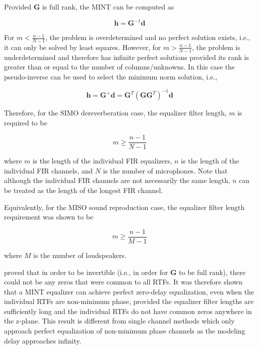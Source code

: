 \noindent
Provided $\boldsymbol{G}$ is full rank, the MINT can be computed as

\begin{equation}
	\boldsymbol{h} = \boldsymbol{G}^{-1}\boldsymbol{d}
\end{equation}

For $m < \frac{n-1}{N-1}$, the problem is overdetermined and no perfect solution exists, i.e., it can only be solved by least squares. However, for $m > \frac{n-1}{N-1}$, the problem is underdetermined and therefore has infinite perfect solutions provided its rank is greater than or equal to the number of columns/unknowns. In this case the pseudo-inverse can be used to select the minimum norm solution, i.e.,

\begin{equation}
	\boldsymbol{h} = \boldsymbol{G}^+\boldsymbol{d} = \boldsymbol{G}^T(\boldsymbol{G}\boldsymbol{G}^T)^{-1}\boldsymbol{d}
\end{equation}


 Therefore, for the SIMO dereverberation case, the equalizer filter length, $m$ is required to be

\begin{equation}
	m \ge \frac{n-1}{N-1}
\end{equation}

\noindent
where $m$ is the length of the individual FIR equalizers, $n$ is the length of the individual FIR channels, and $N$ is the number of microphones. Note that although the individual FIR channels are not necessarily the same length, $n$ can be treated as the length of the longest FIR channel.

Equivalently, for the MISO sound reproduction case, the equalizer filter length requirement was shown to be

\begin{equation}
	m \ge \frac{n-1}{M-1}
\end{equation}

\noindent
where $M$ is the number of loudspeakers.


 \cite{miyoshi1986inverse} proved that in order to be invertible (i.e., in order for $\boldsymbol{G}$ to be full rank), there could not be any zeros that were common to all RTFs. It was therefore shown that a MINT equalizer can achieve perfect zero-delay equalization, even when the individual RTFs are non-minimum phase, provided the equalizer filter lengths are sufficiently long and the individual RTFs do not have common zeros anywhere in the z-plane. This result is different from single channel methods which only approach perfect equalization of non-minimum phase channels as the modeling delay approaches infinity. 
 
